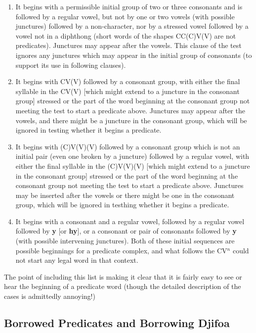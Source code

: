 \documentclass[12pt]{book}
\begin{document}
{\begin{enumerate}

\item  It begins with a permissible initial group of two or three consonants  and is followed by a regular vowel, but not by one or two vowels (with possible junctures) followed by a non-character, nor by a stressed vowel followed by a vowel not in a diphthong (short words of the shapes CC(C)V(V) are not predicates).  Junctures may appear after the vowels.  This clause of the test ignores any junctures which may appear in the initial group of consonants (to support its use in following clauses).

\item  It begins with CV(V) followed by a consonant group, with either the final syllable in the CV(V) [which might extend to a juncture in the consonant group] stressed or the part of the word beginning at the consonant group not meeting the test to start a predicate above.  Junctures may appear after the vowels, and there might be a juncture in the consonant group, which will be ignored in testing whether it begins a predicate.

\item  It begins with (C)V(V)(V) followed by a consonant group which is not an initial pair (even one broken by a juncture)  followed by a regular vowel, with either the final syllable in the (C)V(V)(V) [which might extend to a juncture in the consonant group]  stressed or the part of the word beginning at the consonant group not meeting the test to start a predicate above.  Junctures may be inserted after the vowels or there might be one in the consonant group, which will be ignored in testhing whether it begins a predicate.

\item It begins with a consonant and a regular vowel, followed by a regular vowel followed by {\bf y} [or {\bf hy}], or a consonant or pair of consonants followed by {\bf y} (with possible intervening junctures).  Both of these initial sequences
are possible beginnings for a predicate complex, and what follows the CV$^n$ could not start any legal word in that context.

\end{enumerate}

The point of including this list is making it clear that it is fairly easy to see or hear the beginning of a predicate word (though the detailed description of the cases is admittedly annoying!)

\subsection{Borrowed Predicates and Borrowing Djifoa}

}
\end{document}
